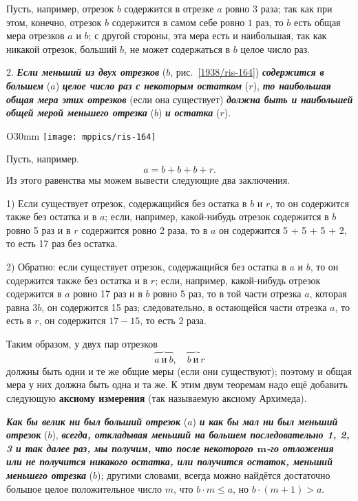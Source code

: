 Пусть, например, отрезок $b$ содержится в отрезке $a$ ровно $3$ раза;
так как при этом, конечно, отрезок $b$ содержится в самом себе ровно $1$ раз, то $b$ есть общая мера отрезков $a$ и $b$;
с другой стороны, эта мера есть и наибольшая, так как никакой отрезок, больший $b$, не может содержаться в $b$ целое число раз.

2.
\textbf{\emph{Если меньший из двух отрезков}} ($b$, рис.~\ref{1938/ris-164}) \textbf{\emph{содержится в большем}} ($a$) \textbf{\emph{целое число раз с некоторым остатком}} ($r$), \textbf{\emph{то наибольшая общая мера этих отрезков}} (если она существует) \textbf{\emph{должна быть и наибольшей общей мерой меньшего отрезка}} ($b$) \textbf{\emph{и остатка}} ($r$).

\begin{wrapfigure}{O}{30mm}
\centering
\texttt{[image: mppics/ris-164]}
\caption{}\label{1938/ris-164}
\end{wrapfigure}

Пусть, например.
\[a=b+b+b+r.\]
Из этого равенства мы можем вывести следующие два заключения.

1) Если существует отрезок, содержащийся без остатка в $b$ и $r$, то он содержится также без остатка и в $a$;
если, например, какой-нибудь отрезок содержится в $b$ ровно 5 раз и в $r$ содержится ровно 2 раза, то в $a$ он содержится 5 + 5 + 5 + 2, то есть 17 раз без остатка.

2) Обратно:
если существует отрезок, содержащийся без остатка в $a$ и $b$, то он содержится также без остатка и в $r$;
если, например, какой-нибудь отрезок содержится в $a$ ровно 17 раз и в $b$ ровно 5 раз, то в той части отрезка $a$, которая равна $3b$, он содержится 15 раз;
следовательно, в остающейся части отрезка $a$, то есть в $r$, он содержится $17-15$, то есть 2 раза.

Таким образом, у двух пар отрезков
\[\overbrace{a\ \text{и}\ b},\quad \overbrace{b\ \text{и}\ r}\]
должны быть одни и те же общие меры (если они существуют);
поэтому и  общая мера у них должна быть одна и та же.
К этим двум теоремам надо ещё добавить следующую \textbf{аксиому измерения} (так называемую аксиому Архимеда). 

\textbf{\emph{Как бы велик ни был больший отрезок}} ($a$) \textbf{\emph{и как бы мал ни был меньший отрезок}} ($b$), \textbf{\emph{всегда, откладывая меньший на большем последовательно 1, 2, 3 и так далее раз, мы получим, что после некоторого $\bm{m}$-го отложения или не получится никакого остатка, или получится остаток, меньший меньшего отрезка}} ($b$);
другими словами, всегда можно найдётся достаточно большое целое положительное число $m$, что $b \cdot  m \le a$, но $b \cdot  (m + 1) > a$. 

